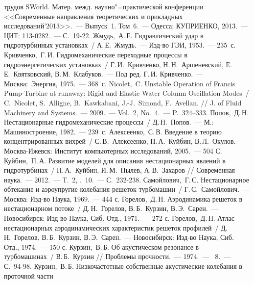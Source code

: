 \begin{thebibliography}{999}
                 трудов SWorld. Матер. межд. научно"=практической конференции <<Современные 
                 направления теоретических и прикладных исследований'2013>>.~--- Выпуск~1. Том~6.~--- 
                 Одесса: КУПРИЕНКО, 2013.~--- ЦИТ: 113-0282.~--- С.~19-22.
%
\Rus
{}  Жмудь,~А.\,Е. Гидравлический удар в гидротурбинных установках~/ А.\,Е.~Жмудь.~--- 
                Изд-во ГЭИ, 1953.~--- 235~с.
%
\Rus
{} Кривченко,~Г.\,И. Гидромеханические переходные процессы в гидроэнергетических 
                 установках~/ Г.\,И.~Кривченко, Н.\,Н.~Аршеневский, Е.\,Е.~Квятковский, В.\,М.~Клабуков.~--- 
                 Под ред. Г.\,И. Кривченко.~--- Москва:~Энергия, 1975.~--- 368~с.
%
\Eng 
{} Nicolet,~C. Unstable Operation of Francis Pump-Turbine at runaway: Rigid and Elastic Water 
                Column Oscillation Modes~/ C.~Nicolet, S.~Alligne, B.~Kawkabani, J.-J.~Simond, F.~Avellan. //
                J. of Fluid Machinery and Systems.~--- 2009.~--- Vol.~2, No.~4.~--- P.~324--333.
%
\Rus
{} Попов,~Д.\,Н. Нестационарные гидромеханические процессы~/ Д.\,Н.~Попов.~--- 
                М.: Машиностроение, 1982.~--- 239~с.
%
\Rus
{} Алексеенко,~С.\,В. Введение в теорию концентрированных вихрей~/ С.\,В.~Алексеенко, 
                П.\,А.~Куйбин, В.\,Л.~Окулов.~--- Москва-Ижевск: Институт компьютерных исследований, 
                2005.~--- 504 С.
%
\Rus
{} Куйбин,~П.\,А. Развитие моделей для описания нестационарных явлений в гидротурбинах~/
                П.\,А.~Куйбин, И.\,М.~Пылев, А.\,В.~Захаров // Современная наука.~--- 2012.~--- 
                Т.~2, \No.~10.~--- С.~232-238.
%
\Rus
{} Самойлович,~Г.\,С. Нестационарное обтекание и аэроупругие колебания решеток 
                турбомашин~/ Г.\,С.~Самойлович.~--- Москва: Изд-во Наука, 1969.~--- 444 с.
%
\Rus
{} Горелов,~Д.\,Н. Аэродинамика решеток в нестационарном потоке~/ Д.\,Н.~Горелов, 
                В.\,Б.~Курзин, В.\,Э.~Сарен.~--- Новосибирск: Изд-во Наука, Сиб. Отд., 1971.~--- 272 с.
%
\Rus
{} Горелов,~Д.\,Н. Атлас нестационарных аэродинамических характеристик решеток 
                профилей~/ Д.\,Н.~Горелов, В.\,Б.~Курзин, В.\,Э.~Сарен.~--- Новосибирск: Изд-во Наука, 
                Сиб. Отд., 1974.~--- 150 с.
%
\Rus
{} Курзин,~В.\,Б. Об акустическом резонансе в турбомашинах~/ В.\,Б.~Курзин // Проблемы 
                прочности.~--- 1974.~--- \No~8.~--- С.~94-98.
%
\Rus
{} Курзин,~В.\,Б. Низкочастотные собственные акустические колебания в проточной части

\end{thebibliography}

